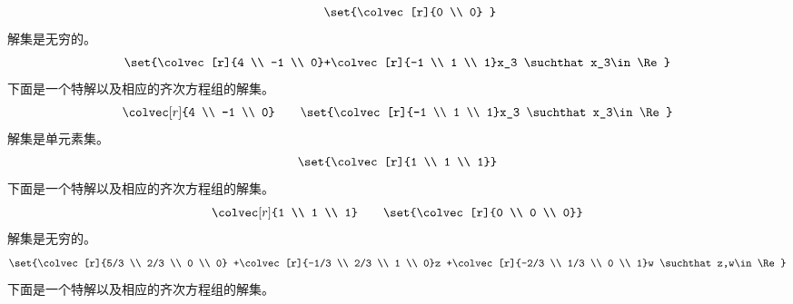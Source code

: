\begin{exercises}
\begin{answer}
\begin{exparts}
\begin{equation*}
              \qquad
            \set{\colvec[r]{0 \\ 0} }
          \end{equation*}
        \partsitem
          解集是无穷的。
          \begin{equation*}
            \set{\colvec[r]{4 \\ -1 \\ 0}+\colvec[r]{-1 \\ 1 \\ 1}x_3
              \suchthat x_3\in\Re}
          \end{equation*}
          下面是一个特解以及相应的齐次方程组的解集。
          \begin{equation*}
            \colvec[r]{4 \\ -1 \\ 0}
              \qquad
            \set{\colvec[r]{-1 \\ 1 \\ 1}x_3
              \suchthat x_3\in\Re}
          \end{equation*}
        \partsitem
          解集是单元素集。
          \begin{equation*}
            \set{\colvec[r]{1 \\ 1 \\ 1}}
          \end{equation*}
          下面是一个特解以及相应的齐次方程组的解集。
          \begin{equation*}
            \colvec[r]{1 \\ 1 \\ 1}
              \qquad
            \set{\colvec[r]{0 \\ 0 \\ 0}}
          \end{equation*}
        \partsitem
          解集是无穷的。
          \begin{equation*}
            \set{\colvec[r]{5/3 \\ 2/3 \\ 0 \\ 0}
                 +\colvec[r]{-1/3 \\ 2/3 \\ 1 \\ 0}z
                 +\colvec[r]{-2/3 \\ 1/3 \\ 0 \\ 1}w
                 \suchthat z,w\in\Re}
          \end{equation*}
          下面是一个特解以及相应的齐次方程组的解集。

\end{exparts}
\end{answer}
\end{exercises}

